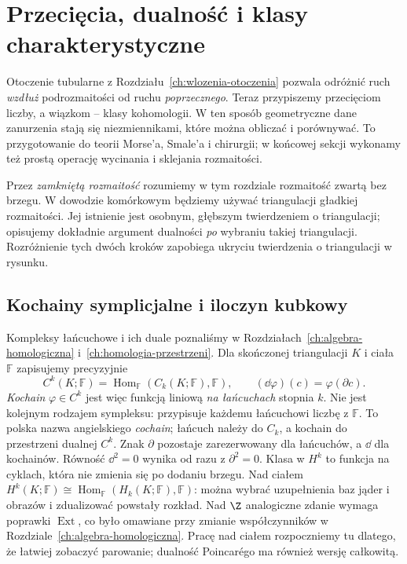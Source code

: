 \chapter{Przecięcia, dualność i klasy charakterystyczne}
\label{ch:przeciecia-dualnosc-klasy}

Otoczenie tubularne z Rozdziału~\ref{ch:wlozenia-otoczenia}
pozwala odróżnić ruch \emph{wzdłuż} podrozmaitości
od ruchu \emph{poprzecznego}. Teraz przypiszemy
przecięciom liczby, a wiązkom -- klasy kohomologii.
W ten sposób geometryczne dane zanurzenia stają się
niezmiennikami, które można obliczać i porównywać.
To przygotowanie do teorii Morse'a, Smale'a i chirurgii;
w końcowej sekcji wykonamy też prostą operację
wycinania i sklejania rozmaitości.

Przez \emph{zamkniętą rozmaitość} rozumiemy w tym
rozdziale rozmaitość zwartą bez brzegu. W dowodzie
komórkowym będziemy używać triangulacji gładkiej
rozmaitości. Jej istnienie jest osobnym, głębszym
twierdzeniem o triangulacji; opisujemy dokładnie
argument dualności \emph{po} wybraniu takiej
triangulacji. Rozróżnienie tych dwóch kroków
zapobiega ukryciu twierdzenia o triangulacji
w rysunku.

\section{Kochainy symplicjalne i iloczyn kubkowy}
\label{sec:kubek-16}

Kompleksy łańcuchowe i ich duale poznaliśmy
w Rozdziałach~\ref{ch:algebra-homologiczna}
i~\ref{ch:homologia-przestrzeni}. Dla
skończonej triangulacji $K$ i ciała $\mathbb F$
zapisujemy precyzyjnie
\[
 C^k(K;\mathbb F)
   =\operatorname{Hom}_{\mathbb F}
       (C_k(K;\mathbb F),\mathbb F),
 \qquad
 (\dd\varphi)(c)=\varphi(\partial c).
\]
\emph{Kochain} $\varphi\in C^k$ jest więc
funkcją liniową \emph{na łańcuchach} stopnia $k$.
Nie jest kolejnym rodzajem sympleksu:
przypisuje każdemu łańcuchowi liczbę z
$\mathbb F$. To polska nazwa angielskiego
\emph{cochain}; łańcuch należy do $C_k$,
a kochain do przestrzeni dualnej $C^k$.
Znak $\partial$ pozostaje zarezerwowany
dla łańcuchów, a $\dd$ dla kochainów.
Równość $\dd^2=0$ wynika od razu z
$\partial^2=0$. Klasa w $H^k$ to
funkcja na cyklach, która nie zmienia
się po dodaniu brzegu. Nad ciałem
$H^k(K;\mathbb F)\cong
\operatorname{Hom}_{\mathbb F}(H_k(K;\mathbb F),\mathbb F)$:
można wybrać uzupełnienia baz jąder
i obrazów i zdualizować powstały
rozkład. Nad $\Z$ analogiczne zdanie
wymaga poprawki $\operatorname{Ext}$,
co było omawiane przy zmianie
współczynników w Rozdziale~\ref{ch:algebra-homologiczna}.
Pracę nad ciałem rozpoczniemy tu dlatego,
że łatwiej zobaczyć parowanie;
dualność Poincarégo ma również
wersję całkowitą.

